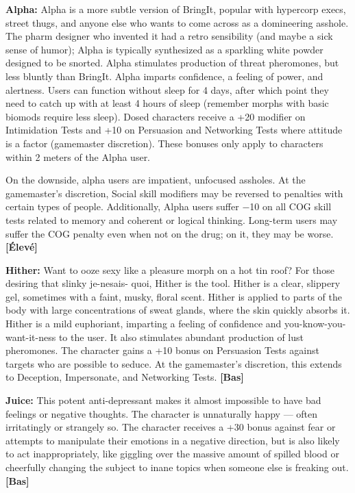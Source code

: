 {{\textbf{Alpha:} Alpha is a more subtle version of BringIt, popular with hypercorp execs, street thugs, and anyone else who wants to come across as a domineering asshole. The pharm designer who invented it had a retro sensibility (and maybe a sick sense of humor); Alpha is typically synthesized as a sparkling white powder designed to be snorted. Alpha stimulates production of threat pheromones, but less bluntly than BringIt. Alpha imparts confidence, a feeling of power, and alertness. Users can function without sleep for 4 days, after which point they need to catch up with at least 4 hours of sleep (remember morphs with basic biomods require less sleep). Dosed characters receive a +20 modifier on Intimidation Tests and +10 on Persuasion and Networking Tests where attitude is a factor (gamemaster discretion). These bonuses only apply to characters within 2 meters of the Alpha user. 

On the downside, alpha users are impatient, unfocused assholes. At the gamemaster’s discretion, Social skill modifiers may be reversed to penalties with certain types of people. Additionally, Alpha users suffer $-$10 on all COG skill tests related to memory and coherent or logical thinking. Long-term users may suffer the COG penalty even when not on the drug; on it, they may be worse. \textbf{[Élevé]} 

\textbf{Hither:} Want to ooze sexy like a pleasure morph on a hot tin roof? For those desiring that slinky je-nesais- quoi, Hither is the tool. Hither is a clear, slippery gel, sometimes with a faint, musky, floral scent. Hither is applied to parts of the body with large concentrations of sweat glands, where the skin quickly absorbs it. Hither is a mild euphoriant, imparting a feeling of confidence and you-know-you-want-it-ness to the user. It also stimulates abundant production of lust pheromones. The character gains a +10 bonus on Persuasion Tests against targets who are possible to seduce. At the gamemaster’s discretion, this extends to Deception, Impersonate, and Networking Tests. \textbf{[Bas]} 

\textbf{Juice:} This potent anti-depressant makes it almost impossible to have bad feelings or negative thoughts. The character is unnaturally happy --- often irritatingly or strangely so. The character receives a +30 bonus against fear or attempts to manipulate their emotions in a negative direction, but is also likely to act inappropriately, like giggling over the massive amount of spilled blood or cheerfully changing the subject to inane topics when someone else is freaking out. \textbf{[Bas]} 



}}
